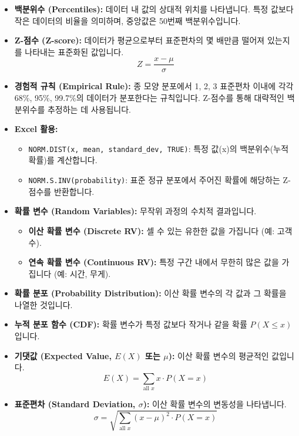 \documentclass[11pt,a4paper]{book}
\theoremstyle{definition}
\begin{document}
\begin{infobox}[title={모듈 2 파트 2/5 핵심 요약}]
\begin{itemize}
    \item \textbf{백분위수 (Percentiles):} 데이터 내 값의 상대적 위치를 나타냅니다. 특정 값보다 작은 데이터의 비율을 의미하며, 중앙값은 50번째 백분위수입니다.
    \item \textbf{Z-점수 (Z-score):} 데이터가 평균으로부터 표준편차의 몇 배만큼 떨어져 있는지를 나타내는 표준화된 값입니다.
    \[ Z = \frac{x - \mu}{\sigma} \]
    \item \textbf{경험적 규칙 (Empirical Rule):} 종 모양 분포에서 1, 2, 3 표준편차 이내에 각각 68\%, 95\%, 99.7\%의 데이터가 분포한다는 규칙입니다. Z-점수를 통해 대략적인 백분위수를 추정하는 데 사용됩니다.
    \item \textbf{Excel 활용:}
    \begin{itemize}
        \item \texttt{NORM.DIST(x, mean, standard\_dev, TRUE)}: 특정 값(x)의 백분위수(누적 확률)를 계산합니다.
        \item \texttt{NORM.S.INV(probability)}: 표준 정규 분포에서 주어진 확률에 해당하는 Z-점수를 반환합니다.
    \end{itemize}
    \item \textbf{확률 변수 (Random Variables):} 무작위 과정의 수치적 결과입니다.
    \begin{itemize}
        \item \textbf{이산 확률 변수 (Discrete RV):} 셀 수 있는 유한한 값을 가집니다 (예: 고객 수).
        \item \textbf{연속 확률 변수 (Continuous RV):} 특정 구간 내에서 무한히 많은 값을 가집니다 (예: 시간, 무게).
    \end{itemize}
    \item \textbf{확률 분포 (Probability Distribution):} 이산 확률 변수의 각 값과 그 확률을 나열한 것입니다.
    \item \textbf{누적 분포 함수 (CDF):} 확률 변수가 특정 값보다 작거나 같을 확률 \(P(X \le x)\)입니다.
    \item \textbf{기댓값 (Expected Value, \(E(X)\) 또는 \(\mu\)):} 이산 확률 변수의 평균적인 값입니다.
    \[ E(X) = \sum_{\text{all } x} x \cdot P(X=x) \]
    \item \textbf{표준편차 (Standard Deviation, \(\sigma\)):} 이산 확률 변수의 변동성을 나타냅니다.
    \[ \sigma = \sqrt{\sum_{\text{all } x} (x - \mu)^2 \cdot P(X=x)} \]
\end{itemize}
\end{infobox}
\end{document}
